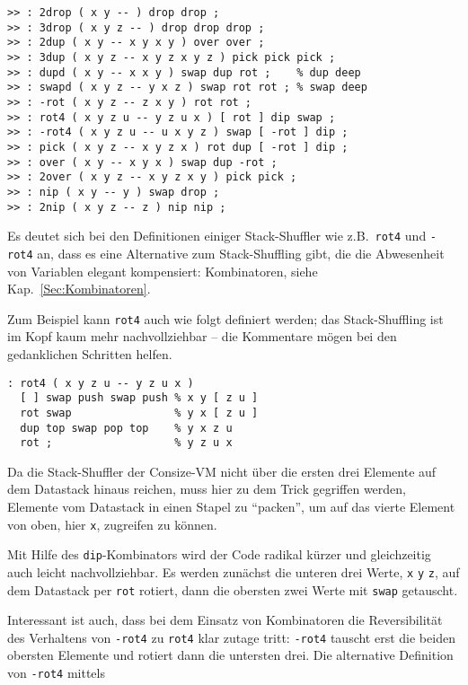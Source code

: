 \begin{verbatim}
>> : 2drop ( x y -- ) drop drop ;
>> : 3drop ( x y z -- ) drop drop drop ;
>> : 2dup ( x y -- x y x y ) over over ;
>> : 3dup ( x y z -- x y z x y z ) pick pick pick ;
>> : dupd ( x y -- x x y ) swap dup rot ;    % dup deep
>> : swapd ( x y z -- y x z ) swap rot rot ; % swap deep
>> : -rot ( x y z -- z x y ) rot rot ;
>> : rot4 ( x y z u -- y z u x ) [ rot ] dip swap ;
>> : -rot4 ( x y z u -- u x y z ) swap [ -rot ] dip ;
>> : pick ( x y z -- x y z x ) rot dup [ -rot ] dip ;
>> : over ( x y -- x y x ) swap dup -rot ;
>> : 2over ( x y z -- x y z x y ) pick pick ;
>> : nip ( x y -- y ) swap drop ;
>> : 2nip ( x y z -- z ) nip nip ;
\end{verbatim}

Es deutet sich bei den Definitionen einiger Stack-Shuffler wie z.B.\ \verb|rot4| und \verb|-rot4| an, dass es eine Alternative zum Stack-Shuffling gibt, die die Abwesenheit von Variablen elegant kompensiert: Kombinatoren, siehe Kap.~\ref{Sec:Kombinatoren}.

Zum Beispiel kann \verb|rot4| auch wie folgt definiert werden; das Stack-Shuffling ist im Kopf kaum mehr nachvollziehbar -- die Kommentare mögen bei den gedanklichen Schritten helfen.

\begin{verbatim}
: rot4 ( x y z u -- y z u x )
  [ ] swap push swap push % x y [ z u ]
  rot swap                % y x [ z u ]
  dup top swap pop top    % y x z u
  rot ;                   % y z u x
\end{verbatim}

Da die Stack-Shuffler der Consize-VM nicht über die ersten drei Elemente auf dem Datastack hinaus reichen, muss hier zu dem Trick gegriffen werden, Elemente vom Datastack in einen Stapel zu "`packen"', um auf das vierte Element von oben, hier \verb|x|, zugreifen zu können.

Mit Hilfe des \verb|dip|-Kombinators wird der Code radikal kürzer und gleichzeitig auch leicht nachvollziehbar. Es werden zunächst die unteren drei Werte, \verb|x| \verb|y| \verb|z|, auf dem Datastack per \verb|rot| rotiert, dann die obersten zwei Werte mit \verb|swap| getauscht.

Interessant ist auch, dass bei dem Einsatz von Kombinatoren die Reversibilität des Verhaltens von \verb|-rot4| zu \verb|rot4| klar zutage tritt: \verb|-rot4| tauscht erst die beiden obersten Elemente und rotiert dann die untersten drei. Die alternative Definition von \verb|-rot4| mittels

